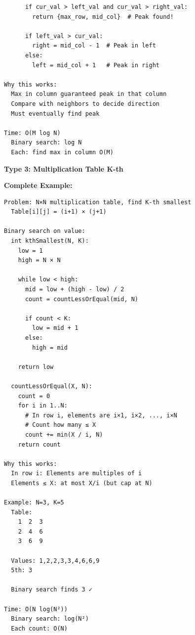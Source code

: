 \documentclass[11pt,a4paper,oneside]{book}
\begin{document}
\begin{tcolorbox}[
    enhanced,breakable,
    colback=lightgray,
    colframe=accentorange,
    boxrule=2pt,
    arc=4mm,
    title=\textbf{Complete Advanced Patterns}
]
\begin{verbatim}
      if cur_val > left_val and cur_val > right_val:
        return {max_row, mid_col}  # Peak found!
      
      if left_val > cur_val:
        right = mid_col - 1  # Peak in left
      else:
        left = mid_col + 1   # Peak in right

Why this works:
  Max in column guaranteed peak in that column
  Compare with neighbors to decide direction
  Must eventually find peak

Time: O(M log N)
  Binary search: log N
  Each: find max in column O(M)
\end{verbatim}

\textbf{Type 3: Multiplication Table K-th}

\textbf{Complete Example:}
\begin{verbatim}
Problem: N×N multiplication table, find K-th smallest
  Table[i][j] = (i+1) × (j+1)

Binary search on value:
  int kthSmallest(N, K):
    low = 1
    high = N × N
    
    while low < high:
      mid = low + (high - low) / 2
      count = countLessOrEqual(mid, N)
      
      if count < K:
        low = mid + 1
      else:
        high = mid
    
    return low
  
  countLessOrEqual(X, N):
    count = 0
    for i in 1..N:
      # In row i, elements are i×1, i×2, ..., i×N
      # Count how many ≤ X
      count += min(X / i, N)
    return count

Why this works:
  In row i: Elements are multiples of i
  Elements ≤ X: at most X/i (but cap at N)

Example: N=3, K=5
  Table:
    1  2  3
    2  4  6
    3  6  9
  
  Values: 1,2,2,3,3,4,6,6,9
  5th: 3
  
  Binary search finds 3 ✓

Time: O(N log(N²))
  Binary search: log(N²)
  Each count: O(N)
\end{verbatim}
\end{tcolorbox}
\end{document}
